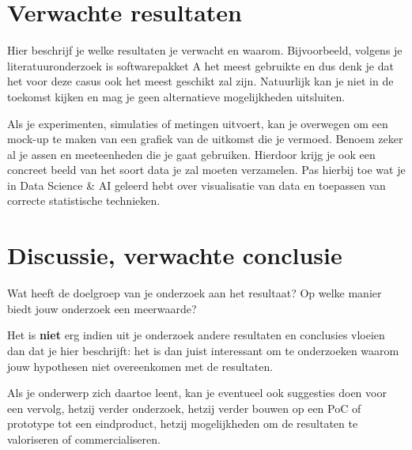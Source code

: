 \documentclass{hogent-article}
\begin{document}
\section{Verwachte resultaten}%
\label{sec:verwachte-resultaten}


Hier beschrijf je welke resultaten je verwacht en waarom. Bijvoorbeeld, volgens je literatuuronderzoek is softwarepakket A het meest gebruikte en dus denk je dat het voor deze casus ook het meest geschikt zal zijn. Natuurlijk kan je niet in de toekomst kijken en mag je geen alternatieve mogelijkheden uitsluiten.

Als je experimenten, simulaties of metingen uitvoert, kan je overwegen om een mock-up te maken van een grafiek van de uitkomst die je vermoed. Benoem zeker al je assen en meeteenheden die je gaat gebruiken. Hierdoor krijg je ook een concreet beeld van het soort data je zal moeten verzamelen. Pas hierbij toe wat je in Data Science \& AI geleerd hebt over visualisatie van data en toepassen van correcte statistische technieken.

\section{Discussie, verwachte conclusie}%
\label{sec:discussie-conclusie}

Wat heeft de doelgroep van je onderzoek aan het resultaat? Op welke manier biedt jouw onderzoek een meerwaarde?

Het is \textbf{niet} erg indien uit je onderzoek andere resultaten en conclusies vloeien dan dat je hier beschrijft: het is dan juist interessant om te onderzoeken waarom jouw hypothesen niet overeenkomen met de resultaten.

Als je onderwerp zich daartoe leent, kan je eventueel ook suggesties doen voor een vervolg, hetzij verder onderzoek, hetzij verder bouwen op een PoC of prototype tot een eindproduct, hetzij mogelijkheden om de resultaten te valoriseren of commercialiseren.


\printbibliography[heading=bibintoc]
\end{document}
